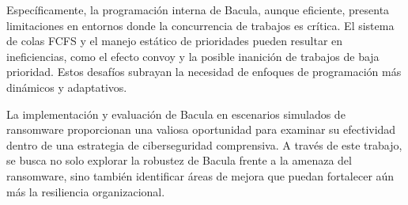Específicamente, la programación interna de Bacula, aunque eficiente, presenta limitaciones en entornos donde la concurrencia de trabajos es crítica. El sistema de colas FCFS y el manejo estático de prioridades pueden resultar en ineficiencias, como el efecto convoy y la posible inanición de trabajos de baja prioridad. Estos desafíos subrayan la necesidad de enfoques de programación más dinámicos y adaptativos.\medskip

La implementación y evaluación de Bacula en escenarios simulados de ransomware proporcionan una valiosa oportunidad para examinar su efectividad dentro de una estrategia de ciberseguridad comprensiva. A través de este trabajo, se busca no solo explorar la robustez de Bacula frente a la amenaza del ransomware, sino también identificar áreas de mejora que puedan fortalecer aún más la resiliencia organizacional.\medskip
